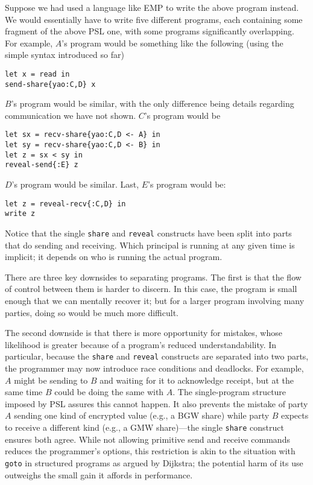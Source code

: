 \documentclass[10pt]{article}
\begin{document}
Suppose we had used a language like EMP to write the above program
instead. We would essentially have to write five different programs,
each containing some fragment of the above PSL one, with some
programs significantly overlapping. For example, $A$'s program would
be something like the following (using the simple syntax introduced
so far)
\begin{verbatim}
let x = read in 
send-share{yao:C,D} x
\end{verbatim}
$B$'s program would be similar, with the only difference being details
regarding communication we have not shown. $C$'s program would be
\begin{verbatim}
let sx = recv-share{yao:C,D <- A} in
let sy = recv-share{yao:C,D <- B} in
let z = sx < sy in 
reveal-send{:E} z
\end{verbatim}
$D$'s program would be similar. Last, $E$'s program would be:
\begin{verbatim}
let z = reveal-recv{:C,D} in
write z
\end{verbatim}
Notice that the single \texttt{share} and \texttt{reveal} constructs
have been split into parts that do sending and receiving. Which
principal is running at any given time is implicit; it depends on who
is running the actual program.

There are three key downsides to separating programs. The first is
that the flow of control between them is harder to discern. In this
case, the program is small enough that we can mentally recover it; but
for a larger program involving many parties, doing so would be much
more difficult. 

The second downside is that there is more opportunity for mistakes,
whose likelihood is greater because of a program's reduced
understandability. In particular, because the \texttt{share} and
\texttt{reveal} constructs are separated into two parts, the
programmer may now introduce race conditions and deadlocks. For
example, $A$ might be sending to $B$ and waiting for it to acknowledge
receipt, but at the same time $B$ could be doing the same with $A$. The
single-program structure imposed by PSL assures this cannot happen. It
also prevents the mistake of party $A$ sending one kind of encrypted
value (e.g., a BGW share) while party $B$ expects to receive a
different kind (e.g., a GMW share)---the single \texttt{share}
construct ensures both agree. While not allowing primitive send and
receive commands reduces the programmer's options, this restriction is
akin to the situation with \texttt{goto} in structured programs as
argued by Dijkstra; the
potential harm of its use outweighs the small gain it affords in
performance.
\end{document}

